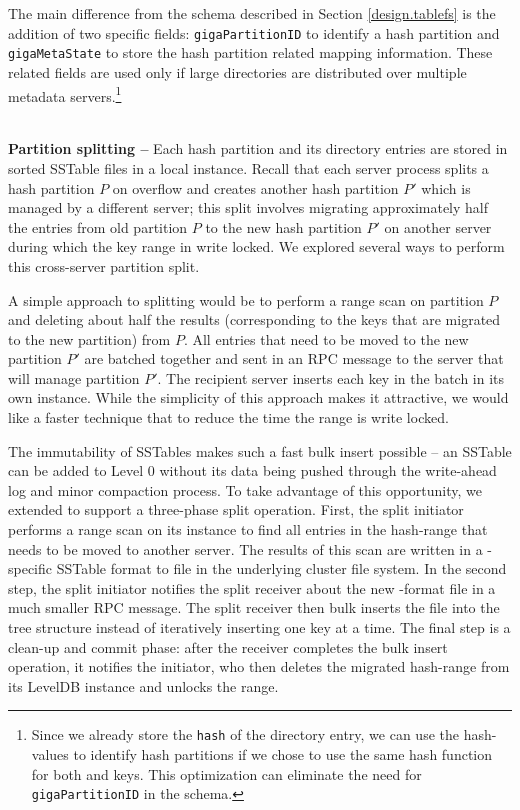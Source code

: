 The main difference from the \ldb{} schema described in Section
\ref{design.tablefs} is the addition of two \giga specific fields: 
\texttt{gigaPartitionID} to identify a
\giga{} hash partition and \texttt{gigaMetaState} to store the
hash partition related mapping information. These \giga{} related fields are 
used only if large directories are distributed over multiple metadata servers.\footnote{
Since we already store the \texttt{hash} of the directory entry, we can use the
hash-values to identify hash partitions if we chose to use the same hash
function for both \giga and \ldb keys. This optimization can eliminate the
need for \texttt{gigaPartitionID} in the schema.} 

~\\
\textbf{Partition splitting -- }
Each \giga{} hash partition and its directory entries are stored in sorted
SSTable files in a local \ldb{} instance. 
Recall that each \giga{} server process splits a hash partition $P$ on 
overflow and creates another hash partition $P'$ which is managed by a 
different server; this split involves migrating approximately half the entries 
from old partition $P$ to the new hash partition $P'$ on another server during
which the key range in write locked.
We explored several ways to perform this cross-server partition split.

A simple approach to splitting would be to perform a \ldb range scan on 
partition $P$ and deleting about half the results (corresponding to the keys
that are migrated to the new partition) from $P$. 
All entries that need to be moved to the new partition $P'$ are batched
together and sent in an RPC message to the server that will manage partition 
$P'$.
The recipient server inserts each key in the batch in its own \ldb{}
instance. While the simplicity of this approach makes it attractive, we would
like a faster technique that to reduce the time the range is write locked. 

The immutability of \ldb SSTables makes such a fast bulk insert possible -- an
SSTable can be added to Level 0 without its data being pushed through the
write-ahead log and minor compaction process.
To take advantage of this opportunity, we extended \ldb{}
to support a three-phase split operation. 
First, the split initiator performs a range scan on its \ldb{} instance to find all
entries in the hash-range that needs to be moved to another server. The results
of this scan are written in a \ldb{}-specific SSTable format to file in the
underlying cluster file system. 
In the second step, the split initiator notifies the split receiver about
the new \ldb{}-format file in a much smaller RPC message.
The split receiver then bulk inserts the file into the \ldb{} tree structure 
instead of iteratively inserting one key at a time.
The final step is a clean-up and commit phase: after the receiver completes the 
bulk insert operation, it notifies the 
initiator, who then deletes the migrated hash-range from its LevelDB instance
and unlocks the range.%

